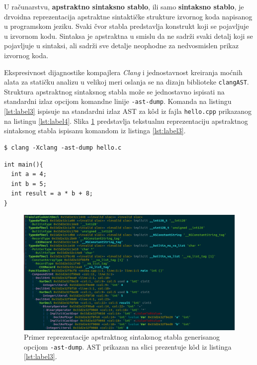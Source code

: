 \documentclass[12pt,oneside]{memoir}
\begin{document}
U računarstvu, \textbf{apstraktno sintaksno stablo}, ili samo \textbf{sintaksno stablo}, je drvoidna reprezentacija apstraktne sintaktičke strukture izvornog koda napisanog u programskom jeziku. Svaki čvor stabla predstavlja konstrukt koji se pojavljuje u izvornom kodu.
Sintaksa je apstraktna u smislu da ne sadr\v{z}i svaki detalj koji se pojavljuje u sintaksi, ali sadr\v{z}i sve detalje neophodne za nedvosmislen prikaz izvornog koda.

Ekspresivnost dijagnostike kompajlera \textit{Clang} i jednostavnost kreiranja mo\'{c}nih alata za stati\v{c}ku analizu u velikoj meri oslanja se na dizajn biblioteke \texttt{clangAST}. Struktura apstraktnog sintaksnog stabla mo\v{z}e se jednostavno ispisati na standardni izlaz opcijom komandne linije \texttt{-ast-dump}. Komanda na listingu \ref{lst:label3} ispisuje na standardni izlaz AST za k\^{o}d iz fajla \texttt{hello.cpp} prikazanog na listingu \ref{lst:label4}. Slika \ref{fig:ASTSlika} predstavlja tekstualnu reprezentaciju apstraktnog sintaksnog stabla ispisanu komandom iz listinga \ref{lst:label3}.
\\


\begin{lstlisting}[style=custombash, caption={Komanda za ispisivanje apstraktnog sintaksnog stabla kompajlera \textit{Clang}.}, label=lst:label3]
$ clang -Xclang -ast-dump hello.c
\end{lstlisting}

\begin{lstlisting}[style=customc, caption={K\^{o}d \v{c}iji je AST prikazan na slici \ref{fig:ASTSlika}.},label=lst:label4]
int main(){
  int a = 4;
  int b = 5;
  int result = a * b + 8;
}
\end{lstlisting}

\begin{figure}[!ht]
  \centering
  \includegraphics[width=1.0\textwidth]{ASTImage.png}
  \caption{Primer reprezentacije apstraktnog sintaksnog stabla generisanog opcijom \texttt{-ast-dump}. AST prikazan na slici prezentuje k\^{o}d iz listinga \ref{lst:label3}.}
  \label{fig:ASTSlika}
\end{figure}
\end{document}
